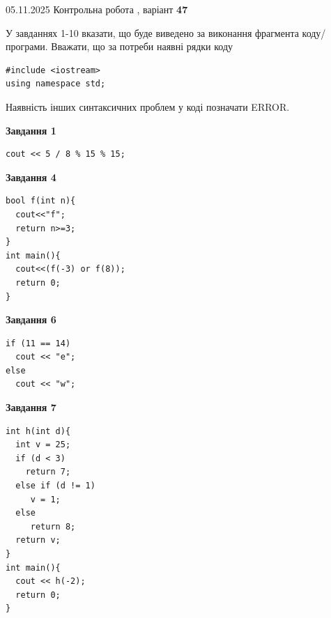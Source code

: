 \documentclass[12pt, ukrainian]{article}
\begin{document}
{\Large{05.11.2025 Контрольна робота , варіант  \No \textbf { 47 }\par}}
{
\begin {large}
У завданнях 1-10 вказати, що буде виведено за виконання фрагмента коду/про\-гра\-ми.
Вважати, що за потреби наявні рядки коду
\begin{verbatim}
#include <iostream>
using namespace std;
\end{verbatim}
Наявність інших синтаксичних проблем у коді позначати ERROR.

\begin{minipage}[t]{7.0cm}

\begin{center}
\textbf{Завдання 1}
\end{center}
\vspace{-8mm}

\begin{verbatim}
cout << 5 / 8 % 15 % 15;
\end{verbatim}



\begin{center}
\textbf{Завдання 4}
\end{center}
\vspace{-8mm}

\begin{verbatim}
bool f(int n){
  cout<<"f";
  return n>=3;
}
int main(){
  cout<<(f(-3) or f(8));
  return 0;
}
\end{verbatim}



\begin{center}
\textbf{Завдання 6}
\end{center}
\vspace{-8mm}

\begin{verbatim}
if (11 == 14)
  cout << "e";
else
  cout << "w";
\end{verbatim}



\begin{center}
\textbf{Завдання 7}
\end{center}
\vspace{-8mm}

\begin{verbatim}
int h(int d){
  int v = 25;
  if (d < 3)
    return 7;
  else if (d != 1)
     v = 1;
  else
     return 8;
  return v;
}
int main(){
  cout << h(-2);
  return 0;
}
\end{verbatim}


\end{minipage}
\end{large}}
\end{document}
